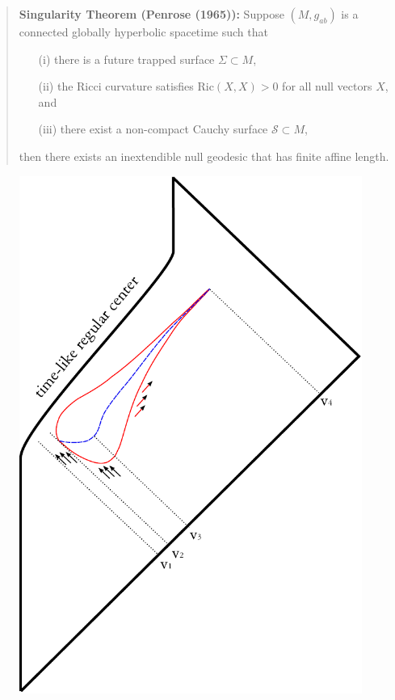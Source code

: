\documentclass[12pt]{article}
\newcommand{\2}{$^2$}
\newcommand{\3}{$^3$}
\newcommand{\4}{$_4$}
\newcommand{\5}{$_5$}
\begin{document}
\begin{quote}
\textbf{Singularity Theorem (Penrose (1965)):} Suppose $(M, g_{ab})$ is a connected globally hyperbolic spacetime such that
\begin{itemize}
\item[(i)] there is a future trapped surface $\Sigma \subset M$,
\item[(ii)] the Ricci curvature satisfies $\text{Ric}(X,X)>0$ for all null vectors $X$, and
\item[(iii)] there exist a non-compact Cauchy surface $\mathcal{S} \subset M$, 
\end{itemize}
then there exists an inextendible null geodesic that has finite affine length. 
\end{quote}

\begin{figure}
\begin{center}
\includegraphics[scale=0.9]{regular_2-eps-converted-to.pdf}

\end{center}
\end{figure}
\end{document}

